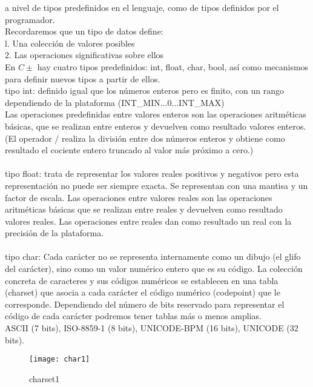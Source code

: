 \documentclass[11pt,a4paper]{article}
\begin{document}
	a nivel de tipos predefinidos en el lenguaje, como de tipos definidos por el programador. \\
	Recordaremos que un tipo de datos define: \\
	l. Una colección de valores posibles \\
	2. Las operaciones significativas sobre ellos \\
	En $C\pm$ hay cuatro tipos predefinidos: int, float, char, bool, así como mecanismos para definir nuevos tipos a partir de ellos.\\
	tipo int: definido igual que los números enteros pero es finito, con un rango dependiendo de la plataforma (INT\_MIN...0...INT\_MAX)\\
	Las operaciones predefinidas entre valores enteros son 
	las operaciones aritméticas básicas, que se realizan entre enteros y devuelven como resultado valores enteros.\\
	(El operador / realiza la división entre dos números enteros y obtiene como resultado el cociente entero truncado al valor más próximo a cero.)\\
	\\
	tipo float: trata de representar los valores reales positivos y negativos pero esta representación no puede ser siempre exacta. Se representan con una mantisa y un factor de escala. Las operaciones entre valores reales son las operaciones aritméticas básicas 
	que se realizan entre reales y devuelven como resultado valores reales. Las operaciones entre reales dan como resultado un 
	real con la precisión de la plataforma. \\
	\\
	tipo char: Cada carácter no se representa internamente como un dibujo (el glifo del carácter), sino como un valor numérico entero que es su código. La colección concreta de caracteres y sus códigos numéricos se establecen en una tabla (charset) que asocia a cada carácter el código numérico (codepoint) que le corresponde. 
	Dependiendo del número de bits reservado para representar el código de cada carácter podremos tener tablas más o menos amplias.	
	\\
	ASCII (7 bits), ISO-8859-1 (8 bits), UNICODE-BPM (16 bits), UNICODE (32 bits).\\
	\begin{figure}[htb]
		\centering
		\texttt{[image: char1]}
		\caption{charset1}
		\label{fig:char1}
	\end{figure}
	
	
	
\end{document}
